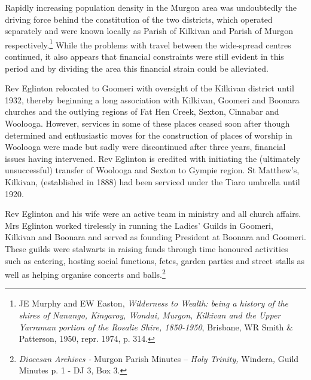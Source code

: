 Rapidly increasing population density in the Murgon area was undoubtedly the driving force behind the constitution of the two districts, which operated separately and were known locally as Parish of Kilkivan and Parish of Murgon respectively.\footnote{JE Murphy and EW Easton, \emph{Wilderness to Wealth: being a history of the shires of Nanango, Kingaroy, Wondai, Murgon, Kilkivan and the Upper Yarraman portion of the Rosalie Shire, 1850-1950}, Brisbane, WR Smith \& Patterson, 1950, repr. 1974, p. 314.} While the problems with travel between the wide-spread centres continued, it also appears that financial constraints were still evident in this period and by dividing the area this financial strain could be alleviated.


\balance


Rev Eglinton relocated to Goomeri with oversight of the Kilkivan district until 1932, thereby beginning a long association with Kilkivan, Goomeri and Boonara churches and the outlying regions of Fat Hen Creek, Sexton, Cinnabar and Woolooga. However, services in some of these places ceased soon after though determined and enthusiastic moves for the construction of places of worship in Woolooga were made but sadly were discontinued after three years, financial issues having intervened. Rev Eglinton is credited with initiating the (ultimately unsuccessful) transfer of Woolooga and Sexton to Gympie region. St Matthew's, Kilkivan, (established in 1888) had been serviced under the Tiaro umbrella until 1920.



Rev Eglinton and his wife were an active team in ministry and all church affairs. Mrs Eglinton worked tirelessly in running the Ladies' Guilds in Goomeri, Kilkivan and Boonara and served as founding President at Boonara and Goomeri. These guilds were stalwarts in raising funds through time honoured activities such as catering, hosting social functions, fetes, garden parties and street stalls as well as helping organise concerts and balls.\footnote{\emph{Diocesan Archives -} Murgon Parish Minutes -- \emph{Holy Trinity,} Windera\emph{,} Guild Minutes p. 1 - DJ 3, Box 3.}


